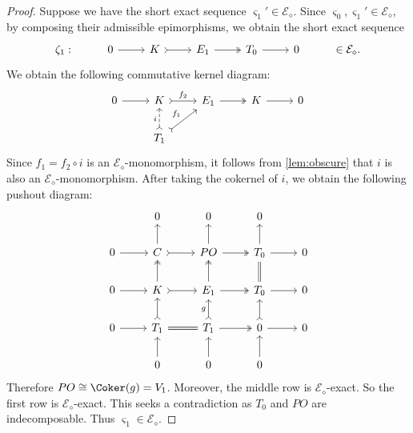 \begin{proof}
Suppose we have the short exact sequence $\varsigma_1' \in \mathcal{E}_\diamond$. Since $\varsigma_0, \varsigma_1' \in \mathcal{E}_\diamond$, by composing their admissible epimorphisms, we obtain the short exact sequence  \[\begin{tikzcd}
	\zeta_1: & 0 & K & E_1 & T_0 &  0 & \in \mathcal{E}_\diamond.
	\arrow[from=1-2, to=1-3]
	\arrow[tail, from=1-3, to=1-4]
	\arrow[two heads,from=1-4, to=1-5]
	\arrow[from=1-5, to=1-6]
\end{tikzcd}\]  We obtain the following commutative kernel diagram:
\[\begin{tikzcd}
	 0 & K & E_1 & K &  0 \\
      & T_1 & & &
	\arrow[from=1-1, to=1-2]
	\arrow[tail,"f_2", from=1-2, to=1-3] 
        \arrow[tail,"f_1",from=2-2, to=1-3]
        \arrow[tail,dashed,"i",from=2-2, to=1-2]
	\arrow[two heads,from=1-3, to=1-4]
	\arrow[from=1-4, to=1-5]
\end{tikzcd}\] 
Since $f_1 = f_2 \circ i$ is an $ \mathcal{E}_\diamond$-monomorphism, it follows from \cref{lem:obscure} that $i$ is also an $\mathcal{E}_\diamond$-monomorphism. After taking the cokernel of $i$, we obtain the following pushout diagram:
\[\begin{tikzcd}
         & 0 & 0 & 0 &  \\
	0 & C & PO  & T_0 &  0 \\
     0 & K & E_1 & T_0 & 0 \\
      0 & T_1 & T_1 & 0 & 0 \\
       & 0 & 0 & 0 & 
	\arrow[from=2-1, to=2-2]
	\arrow[tail, from=2-2, to=2-3]
	\arrow[two heads,from=2-3, to=2-4]
	\arrow[from=2-4, to=2-5]
        \arrow[from=3-1, to=3-2]
	\arrow[tail, from=3-2, to=3-3]
	\arrow[two heads,from=3-3, to=3-4]
	\arrow[from=3-4, to=3-5]
        \arrow[from=4-1, to=4-2]
	\arrow[equals, from=4-2, to=4-3]
	\arrow[two heads,from=4-3, to=4-4]
	\arrow[from=4-4, to=4-5]
        \arrow[from=5-2, to=4-2]
	\arrow[tail, from=4-2, to=3-2]
	\arrow[two heads,from=3-2, to=2-2]
	\arrow[from=2-2, to=1-2]
        \arrow[from=5-3, to=4-3]
	\arrow[tail,"g", from=4-3, to=3-3]
	\arrow[two heads,from=3-3, to=2-3]
	\arrow[from=2-3, to=1-3]
        \arrow[from=5-4, to=4-4]
	\arrow[tail, from=4-4, to=3-4]
	\arrow[equals,from=3-4, to=2-4]
	\arrow[from=2-4, to=1-4]
\end{tikzcd} \]
Therefore $PO \cong \Coker(g) = V_1 $. Moreover, the middle row is ${\mathcal{E}_\diamond}$-exact. So the first row is ${\mathcal{E}_\diamond}$-exact. This seeks a contradiction as $T_0$ and $PO$ are indecomposable. Thus $\varsigma_1 \in \mathcal{E}_\diamond$.


\end{proof}
